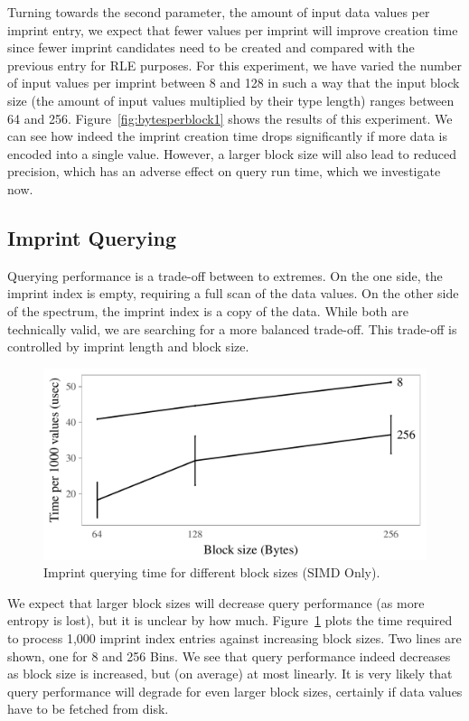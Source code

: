 \documentclass[sigconf]{acmart}
\begin{document}
Turning towards the second parameter, the amount of input data values per imprint entry, we expect that fewer values per imprint will improve creation time since fewer imprint candidates need to be created and compared with the previous entry for RLE purposes. For this experiment, we have varied the number of input values per imprint between 8 and 128 in such a way that the input block size (the amount of input values multiplied by their type length) ranges between 64 and 256. Figure~\ref{fig:bytesperblock1} shows the results of this experiment. We can see how indeed the imprint creation time drops significantly if more data is encoded into a single value. However, a larger block size will also lead to reduced precision, which has an adverse effect on query run time, which we investigate now.

\subsection{Imprint Querying}

Querying performance is a trade-off between to extremes. On the one side, the imprint index is empty, requiring a full scan of the data values. On the other side of the spectrum, the imprint index is a copy of the data. While both are technically valid, we are searching for a more balanced trade-off. This trade-off is controlled by imprint length and block size. 

\begin{figure}[ht]
\begin{center}
\includegraphics[width=\columnwidth,trim=0mm 0mm 0mm 0mm,clip]{qblocksize1.pdf}
\end{center}
\caption{Imprint querying time for different block sizes (SIMD Only).\label{fig:qblocksize1}}
\end{figure}

We expect that larger block sizes will decrease query performance (as more entropy is lost), but it is unclear by how much. Figure~\ref{fig:qblocksize1} plots the time required to process 1,000 imprint index entries against increasing block sizes. Two lines are shown, one for 8 and 256 Bins. We see that query performance indeed decreases as block size is increased, but (on average) at most linearly. It is very likely that query performance will degrade for even larger block sizes, certainly if data values have to be fetched from disk.
\end{document}
